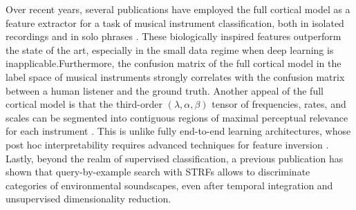 \documentclass{bmcart}
\begin{document}
Over recent years, several publications have employed the full cortical model as a feature extractor for a task of musical instrument classification, both in isolated recordings \cite{patil2012ploscompbiol} and in solo phrases \cite{patil2015eurasip}.
These biologically inspired features  outperform the state of the art, especially in the small data regime when deep learning is inapplicable.Furthermore, the confusion matrix of the full cortical model in the label space of musical instruments strongly correlates with the confusion matrix between a human listener and the ground truth.
Another appeal of the full cortical model is that the third-order $(\lambda, \alpha, \beta)$ tensor of frequencies, rates, and scales can be segmented into contiguous regions of maximal perceptual relevance for each instrument \cite{thoret2016jasa}.
This is unlike fully end-to-end learning architectures, whose post hoc interpretability requires advanced techniques for feature inversion \cite{mishra2018ismir}.
Lastly, beyond the realm of supervised classification, a previous publication \cite{hemery2015frontiers} has shown that query-by-example search with STRFs allows to discriminate categories of environmental soundscapes, even after temporal integration and unsupervised dimensionality reduction.
\end{document}
